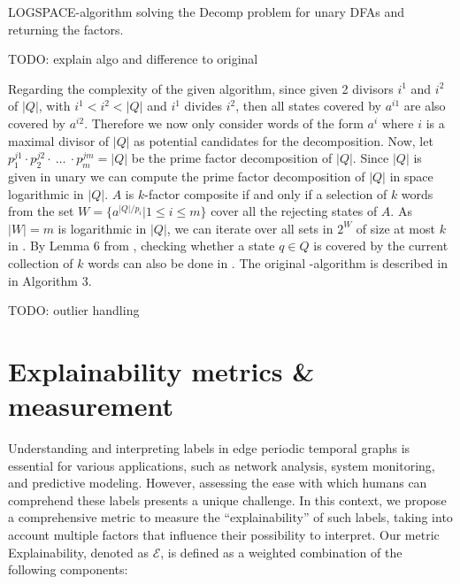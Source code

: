 \begin{algorithm}[H]
	\label{algo:composite}
	\DontPrintSemicolon

	
	
	\caption{LOGSPACE-algorithm solving the Decomp problem for unary DFAs and returning the factors.}
\end{algorithm}

TODO: explain algo and difference to original

Regarding the complexity of the given algorithm, since given 2 divisors $i^1$ and $i^2$ of $|Q|$, with $i^1 < i^2 <|Q|$ and $i^1$ divides $i^2$, then all states covered by $a^{i1}$ are also covered by $a^{i2}$. Therefore we now only consider words of the form $a^i$ where $i$ is a maximal divisor of $|Q|$ as potential candidates for the decomposition. Now, let $p_1^{j1} \cdot p_2^{j2} \cdot ~ \dots ~\cdot p_m^{jm} = |Q|$ be the prime factor decomposition of $|Q|$. Since $|Q|$ is given in unary we can compute the prime factor decomposition of $|Q|$ in space logarithmic in $|Q|$. $A$ is $k$-factor composite if and only if a selection of $k$ words from the set $W = \{a^{|Q|/p_i} | 1 \leq i \leq m\}$ cover all the rejecting states of $A$.  As $|W| = m$ is logarithmic in $|Q|$, we can iterate over all sets in $2^W$ of size at most $k$ in \LogSpace. By Lemma 6 from \cite{DBLP:journals/corr/abs-2107-04683}, checking whether a state $q \in Q$ is covered by the current collection of $k$ words can also be done in \LogSpace. The original \LogSpace-algorithm is described in \cite{DBLP:journals/corr/abs-2107-04683} in Algorithm 3.

TODO: outlier handling

\section{Explainability metrics \& measurement}
Understanding and interpreting labels in edge periodic temporal graphs is essential for various applications, such as network analysis, system monitoring, and predictive modeling. However, assessing the ease with which humans can comprehend these labels presents a unique challenge. In this context, we propose a comprehensive metric to measure the \enquote{explainability} of such labels, taking into account multiple factors that influence their possibility to interpret. Our metric Explainability, denoted as $\mathcal{E}$, is defined as a weighted combination of the following components:

